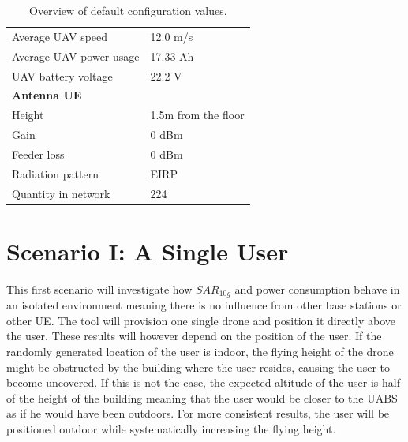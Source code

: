 \begin{table}[!htb]
\begin{tabular}[t]{ll}
        \hspace{3mm}  Average UAV speed                   & 12.0 m/s \\
        \hspace{3mm}  Average UAV power usage             & 17.33 Ah    \\
        \hspace{3mm}  UAV battery voltage                 & 22.2 V \\
        \hline
        \multicolumn{2}{l}{\textbf{Antenna \acs{UE}}} \\
        \hline 
        \hspace{3mm} Height                     & 1.5m from the floor       \\ 
        \hspace{3mm} Gain                      & 0 dBm   \\ 
        \hspace{3mm} Feeder loss               & 0 dBm   \\ 
        \hspace{3mm} Radiation pattern         & \acs{EIRP}  \\
        \hspace{3mm} Quantity in network                & 224  \\
        \toprule
\end{tabular}
\caption{Overview of default configuration values.}
\label{table:defaultconf}
\end{table}

\section{Scenario I: A Single User}
\label{sec:scenarios_s1}

This first scenario will investigate how $SAR_{10g}$ and power consumption behave in an isolated environment meaning there is no influence 
from other base stations or other \gls{UE}. The tool will provision one single drone and position it directly above the user.
These results will however depend on the position of the user. If the randomly generated location of the user is indoor, 
the flying height of the drone might be obstructed by the building where the user resides, causing the user to become uncovered. If this is not the case,
the expected altitude of the user is half of the height of the building meaning that the user would be closer to the \gls{UABS} as 
if he would have been outdoors. For more consistent results, the user will be positioned outdoor while systematically 
increasing the flying height. 

